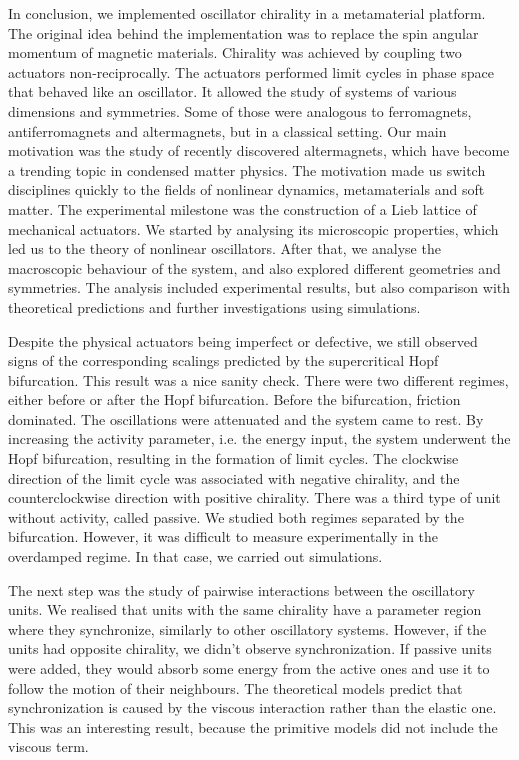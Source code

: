 \documentclass[11pt, a4paper]{article} %
\begin{document}
In conclusion, we implemented oscillator chirality in a metamaterial platform. The original idea behind the implementation was to 
replace the spin angular momentum of magnetic materials. Chirality was achieved by coupling two actuators
non-reciprocally. The actuators performed limit cycles in phase space that behaved like an oscillator. 
It allowed the study of systems of various dimensions and symmetries. Some of those were analogous to 
ferromagnets, antiferromagnets and altermagnets, but in a classical setting. Our main motivation was the study of recently discovered 
altermagnets, which have become a trending topic in condensed matter physics. The motivation made us switch disciplines quickly 
to the fields of nonlinear dynamics, metamaterials and soft matter. The experimental milestone was the construction 
of a Lieb lattice of mechanical actuators. We started by analysing its microscopic properties, which led us to the theory 
of nonlinear oscillators. After that, we analyse the macroscopic behaviour of the system, 
and also explored different geometries and symmetries. The analysis included experimental results, but also 
comparison with theoretical predictions and further investigations using simulations.

Despite the physical actuators being imperfect or defective, we still observed signs of the corresponding scalings 
predicted by the supercritical Hopf bifurcation. This result was a nice sanity check. There were two different regimes, either before 
or after the Hopf bifurcation. Before the bifurcation, friction dominated. The oscillations were attenuated and the system came to rest. 
By increasing the activity parameter, i.e. the energy input, the system underwent the Hopf bifurcation, resulting in the 
formation of limit cycles. The clockwise direction of the limit cycle was associated with negative chirality, and the 
counterclockwise direction with positive chirality. There was a third type of unit without activity, called passive.
We studied both regimes separated by the bifurcation. However, it was difficult to measure experimentally in the overdamped regime. 
In that case, we carried out simulations. 

The next step was the study of pairwise interactions between the oscillatory units. 
We realised that units with the same chirality have a parameter region where they synchronize, 
similarly to other oscillatory systems. However, if the units had opposite chirality, we didn't observe synchronization. 
If passive units were added, they would absorb some energy from the active ones and use it to follow the motion of their neighbours. 
The theoretical models predict that synchronization is caused by the viscous interaction rather than the elastic one. 
This was an interesting result, because the primitive models did not include the viscous term. 
 
\end{document}
